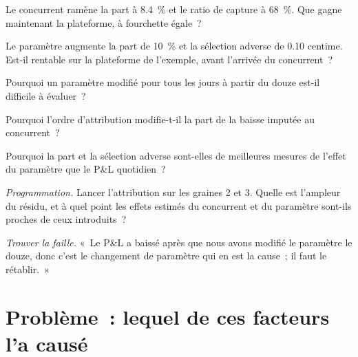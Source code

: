 \begin{exercise}[$\star$]\label{exo:hf:pnl-analytics-and-the-strategy-lifecycle:2}
Le concurrent ramène la part à 8.4~\% et le ratio de capture à 68~\%. Que gagne maintenant la plateforme, à fourchette égale~?
\end{exercise}

\begin{exercise}[$\star$]\label{exo:hf:pnl-analytics-and-the-strategy-lifecycle:3}
Le paramètre augmente la part de 10~\% et la sélection adverse de 0.10 centime. Est-il rentable sur la plateforme de l'exemple, avant l'arrivée du concurrent~?
\end{exercise}

\begin{exercise}[$\star\star$]\label{exo:hf:pnl-analytics-and-the-strategy-lifecycle:4}
Pourquoi un paramètre modifié pour tous les jours à partir du douze est-il difficile à évaluer~?
\end{exercise}

\begin{exercise}[$\star\star$]\label{exo:hf:pnl-analytics-and-the-strategy-lifecycle:5}
Pourquoi l'ordre d'attribution modifie-t-il la part de la baisse imputée au concurrent~?
\end{exercise}

\begin{exercise}[$\star\star$]\label{exo:hf:pnl-analytics-and-the-strategy-lifecycle:6}
Pourquoi la part et la sélection adverse sont-elles de meilleures mesures de l'effet du paramètre que le P\&L quotidien~?
\end{exercise}

\begin{exercise}[$\star\star\star$]\label{exo:hf:pnl-analytics-and-the-strategy-lifecycle:7}
\emph{Programmation.} Lancer l'attribution sur les graines 2 et 3. Quelle est l'ampleur du résidu, et à quel point les effets estimés du concurrent et du paramètre
sont-ils proches de ceux introduits~?
\end{exercise}

\begin{exercise}[$\star\star\star$]\label{exo:hf:pnl-analytics-and-the-strategy-lifecycle:8}
\emph{Trouver la faille.} «~Le P\&L a baissé après que nous avons modifié le paramètre le douze, donc c'est le changement de paramètre qui en est la cause~; il faut le rétablir.~»
\end{exercise}

\section{Problème~: lequel de ces facteurs l'a causé}

